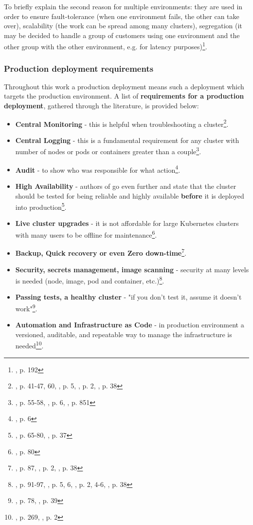 To briefly explain the second reason for multiple environments: they are used in order to ensure fault-tolerance (when one environment fails, the other can take over), scalability (the work can be spread among many clusters), segregation (it may be decided to handle a group of customers using one environment and the other group with the other environment, e.g. for latency purposes)\footnote{\cite{book-iac}, p. 192}.

\subsubsection{Production deployment requirements}
Throughout this work a production deployment means such a deployment which targets the production environment. A list of \textbf{requirements for a production deployment}, gathered through the literature, is provided below:
\begin{itemize}
\item \textbf{Central Monitoring} - this is helpful when troubleshooting a cluster\footnote{\cite{book-mastering-k8s}, p. 41-47, 60, \cite{online-weave-checklists}, p. 5, \cite{online-weave-guide}, p. 2, \cite{book-cndwk}, p. 38}.
\item \textbf{Central Logging} - this is a fundamental requirement for any cluster with number of nodes or pods or containers greater than a couple\footnote{\cite{book-mastering-k8s}, p. 55-58, \cite{online-weave-checklists}, p. 6, \cite{book-devops-k8s}, p. 851}.
\item \textbf{Audit} - to show who was responsible for what action\footnote{\cite{online-weave-guide}, p. 6}.
\item \textbf{High Availability} - authors of \cite{book-mastering-k8s} go even further and state that the cluster should be tested for being reliable and highly available \textbf{before} it is deployed into production\footnote{\cite{book-mastering-k8s}, p. 65-80, \cite{book-cndwk}, p. 37}.
\item \textbf{Live cluster upgrades} - it is not affordable for large Kubernetes clusters with many users to be offline for maintenance\footnote{\cite{book-mastering-k8s}, p. 80}.
\item \textbf{Backup, Quick recovery or even Zero down-time}\footnote{\cite{book-mastering-k8s}, p. 87, \cite{online-weave-guide}, p. 2, \cite{book-cndwk}, p. 38}.
\item \textbf{Security, secrets management, image scanning} - security at many levels is needed (node, image, pod and container, etc.)\footnote{\cite{book-mastering-k8s}, p. 91-97, \cite{online-weave-checklists}, p. 5, 6, \cite{online-weave-guide}, p. 2, 4-6, \cite{book-cndwk}, p. 38}.
\item \textbf{Passing tests, a healthy cluster} - "if you don't test it, assume it doesn't work"\footnote{\cite{book-mastering-k8s}, p. 78, \cite{book-cndwk}, p. 39}.
\item \textbf{Automation and Infrastructure as Code} - in production environment a versioned, auditable, and repeatable way to manage the infrastructure is needed\footnote{\cite{book-mastering-k8s}, p. 269, \cite{online-weave-guide}, p. 2}.
\end{itemize}

